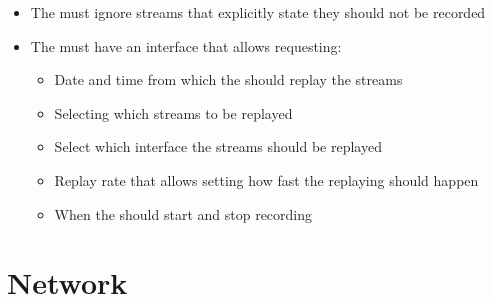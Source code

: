 \begin{itemize}
	\item The  must ignore streams that explicitly state they should not be recorded
	\item The  must have an interface that allows requesting:
	\begin{itemize}
		\item Date and time from which the  should replay the streams
		\item Selecting which streams to be replayed
		\item Select which interface the streams should be replayed
		\item Replay rate that allows setting how fast the replaying should happen
		\item When the  should start and stop recording
	\end{itemize}
\end{itemize}


\section{Network} \label{sec:analysis:network}

